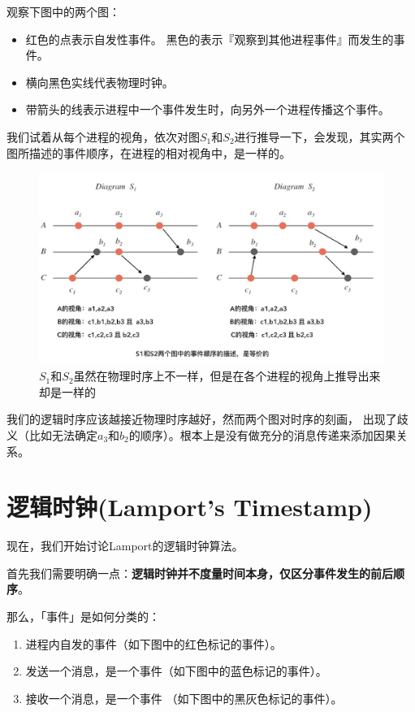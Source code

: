 \documentclass[cn,11pt,chinese]{elegantbook}
\providecommand{\tightlist}{%
  \setlength{\itemsep}{0pt}\setlength{\parskip}{0pt}}
\begin{document}
观察下图中的两个图：

\begin{itemize}
\tightlist
\item
  红色的点表示自发性事件。
  黑色的表示『观察到其他进程事件』而发生的事件。
\item
  横向黑色实线代表物理时钟。
\item
  带箭头的线表示进程中一个事件发生时，向另外一个进程传播这个事件。
\end{itemize}

我们试着从每个进程的视角，依次对图\(S_1\)和\(S_2\)进行推导一下，会发现，其实两个图所描述的事件顺序，在进程的相对视角中，是一样的。

\begin{figure}
\centering
\includegraphics{images/appendix-a-08.jpeg}
\caption{\(S_1\)和\(S_2\)虽然在物理时序上不一样，但是在各个进程的视角上推导出来却是一样的}
\end{figure}

我们的逻辑时序应该越接近物理时序越好，然而两个图对时序的刻画，
出现了歧义（比如无法确定\(a_3\)和\(b_2\)的顺序）。根本上是没有做充分的消息传递来添加因果关系。

\hypertarget{ux903bux8f91ux65f6ux949flamports-timestamp}{%
\section{逻辑时钟(Lamport's
Timestamp)}\label{ux903bux8f91ux65f6ux949flamports-timestamp}}

现在，我们开始讨论Lamport的逻辑时钟算法。

首先我们需要明确一点：\textbf{逻辑时钟并不度量时间本身，仅区分事件发生的前后顺序}。

那么，「事件」是如何分类的：

\begin{enumerate}
\def\labelenumi{\arabic{enumi}.}
\tightlist
\item
  进程内自发的事件（如下图中的红色标记的事件）。
\item
  发送一个消息，是一个事件（如下图中的蓝色标记的事件）。
\item
  接收一个消息，是一个事件 （如下图中的黑灰色标记的事件）。
\end{enumerate}
\end{document}
